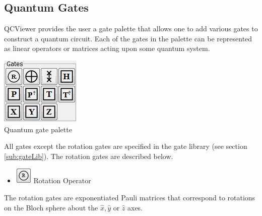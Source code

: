 \documentclass[10pt]{article}
\theoremstyle{definition}
\begin{document}
\subsection{Quantum Gates} \label{sub:QuantumGates}

QCViewer provides the user a gate palette that allows one to add various gates to construct a quantum circuit. Each of the gates in the palette can be represented as linear operators or matrices acting upon some quantum system. 

\begin{center}
\includegraphics{Figures/Gates/Gates.png}\\
Quantum gate palette
\end{center}

All gates except the rotation gates are specified in the gate library (see section \ref{sub:gateLib}).
The rotation gates are described below.

\begin{itemize}
	\item \includegraphics{Figures/Gates/RotationGate.png}  Rotation Operator
\end{itemize}

The rotation gates are exponentiated Pauli matrices that correspond to rotations on the Bloch sphere about the $\hat{x}, \hat{y}$ or $\hat{z}$ axes.
\end{document}
